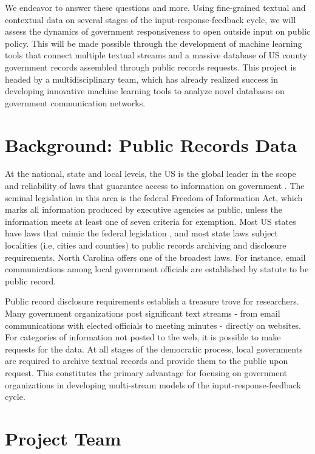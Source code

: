 We endeavor to answer these questions and more. Using fine-grained textual and contextual data on several stages of the input-response-feedback cycle, we will assess the dynamics of government responsiveness to open outside input on public policy. This will be made possible through the development of machine learning tools that connect multiple textual streams and a massive database of US county government records assembled through public records requests. This project is headed by a multidisciplinary team, which has already realized success in developing innovative machine learning tools to analyze novel databases on government communication networks. 


\section{Background: Public Records Data}

At the national, state and local levels, the US is the global leader in the scope and reliability of laws that guarantee access to information on government \cite{Halstuk2006}. The seminal legislation in this area is the federal Freedom of Information Act, which marks all information produced by executive agencies as public, unless the information meets at least one of seven criteria for exemption. Most US states have laws that mimic the federal legislation \cite{Braverman1980}, and most state laws subject localities (i.e, cities and counties) to public records archiving and disclosure requirements. North Carolina offers one of the broadest laws. For instance, email communications among local government officials are established by statute to be public record. 

Public record disclosure requirements establish a treasure trove for researchers. Many government organizations post significant text streams - from email communications with elected officials to meeting minutes - directly on websites. For categories of information not posted to the web, it is possible to make requests for the data. At all stages of the democratic process, local governments are required to archive textual records and provide them to the public upon request. This constitutes the primary advantage for focusing on government organizations in developing multi-stream models of the input-response-feedback cycle. 

\section{Project Team}

